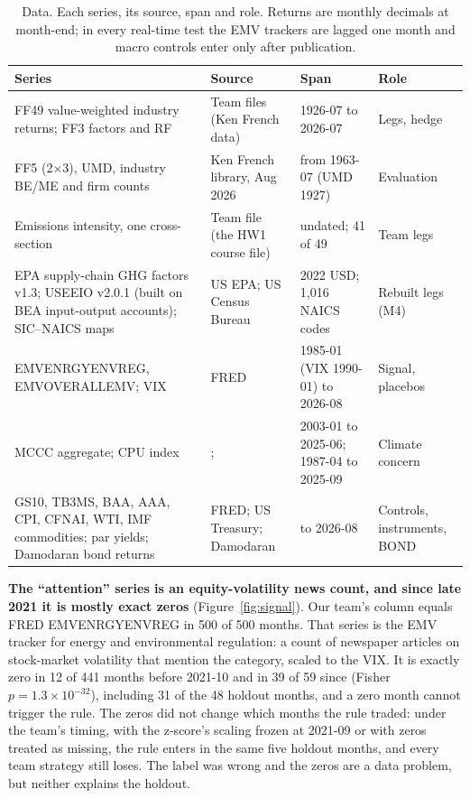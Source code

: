 \begin{table}[!htb]
\caption{Data. Each series, its source, span and role. Returns are monthly decimals at month-end; in every real-time test the EMV trackers are lagged one month and macro controls enter only after publication.}
\label{tab:data}
\centering\footnotesize
\setlength{\tabcolsep}{4pt}
\begin{tabularx}{\textwidth}{@{}L{5.2cm}L{3.3cm}L{3.0cm}Y@{}}
\toprule
Series & Source & Span & Role \\
\midrule
FF49 value-weighted industry returns; FF3 factors and RF & Team files (Ken French data) & 1926-07 to 2026-07 & Legs, hedge \\
FF5 (2$\times$3), UMD, industry BE/ME and firm counts & Ken French library, Aug 2026 & from 1963-07 (UMD 1927) & Evaluation \\
Emissions intensity, one cross-section & Team file (the HW1 course file) & undated; 41 of 49 & Team legs \\
EPA supply-chain GHG factors v1.3; USEEIO v2.0.1 (built on BEA input-output accounts); SIC--NAICS maps & US EPA; US Census Bureau & 2022 USD; 1,016 NAICS codes & Rebuilt legs (M4) \\
EMVENRGYENVREG, EMVOVERALLEMV; VIX & FRED \citep{bbdk2019} & 1985-01 (VIX 1990-01) to 2026-08 & Signal, placebos \\
MCCC aggregate; CPU index & \citet{ardia2023}; \citet{gavriilidis2021} & 2003-01 to 2025-06; 1987-04 to 2025-09 & Climate concern \\
GS10, TB3MS, BAA, AAA, CPI, CFNAI, WTI, IMF commodities; par yields; Damodaran bond returns & FRED; US Treasury; Damodaran & to 2026-08 & Controls, instruments, BOND \\
\bottomrule
\end{tabularx}
\end{table}

\textbf{The ``attention'' series is an equity-volatility news count, and since late 2021 it is mostly exact zeros} (Figure~\ref{fig:signal}). Our team's column equals FRED EMVENRGYENVREG in 500 of 500 months. That series is the \citet{bbdk2019} EMV tracker for energy and environmental regulation: a count of newspaper articles on stock-market volatility that mention the category, scaled to the VIX. It is exactly zero in 12 of 441 months before 2021-10 and in 39 of 59 since (Fisher $p=1.3\times10^{-32}$), including 31 of the 48 holdout months, and a zero month cannot trigger the rule. The zeros did not change which months the rule traded: under the team's timing, with the z-score's scaling frozen at 2021-09 or with zeros treated as missing, the rule enters in the same five holdout months, and every team strategy still loses. The label was wrong and the zeros are a data problem, but neither explains the holdout.

